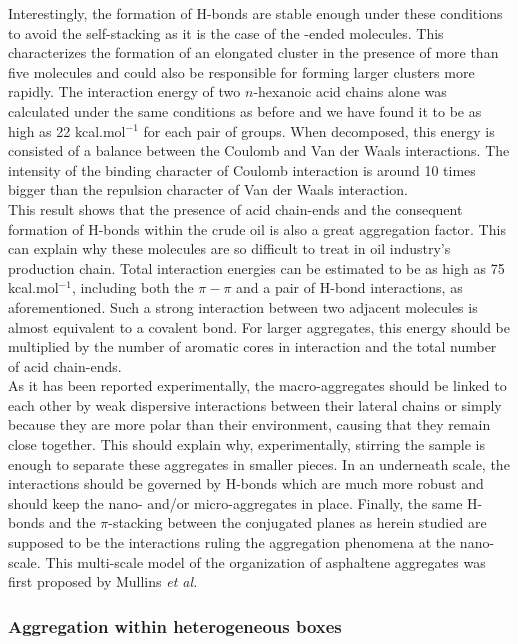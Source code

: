 Interestingly, the formation of H-bonds are stable enough under these conditions to avoid the self-stacking as it is the case of the -ended molecules. This characterizes the formation of an elongated cluster in the presence of more than five molecules and could also be responsible for forming larger clusters more rapidly. The interaction energy of two $n$-hexanoic acid chains alone was calculated under the same conditions as before and we have found it to be as high as 22 kcal.mol$^{-1}$ for each pair of  groups. When decomposed, this energy is consisted of a balance between the Coulomb and Van der Waals interactions. The intensity of the binding character of Coulomb interaction is around 10 times bigger than the repulsion character of Van der Waals interaction.\\ 

This result shows that the presence of acid chain-ends and the consequent formation of H-bonds within the crude oil is also a great aggregation factor. This can explain why these molecules are so difficult to treat in oil industry's production chain. Total interaction energies can be estimated to be as high as 75 kcal.mol$^{-1}$, including both the $\pi-\pi$ and a pair of H-bond interactions, as aforementioned. Such a strong interaction between two adjacent molecules is almost equivalent to a covalent bond. For larger aggregates, this energy should be multiplied by the number of aromatic cores in interaction and the total number of acid chain-ends.\\

As it has been reported experimentally,\cite{durand2010effect} the macro-aggregates should be linked to each other by weak dispersive interactions between their lateral chains or simply because they are more polar than their environment, causing that they remain close together. This should explain why, experimentally, stirring the sample is enough to separate these aggregates in smaller pieces. In an underneath scale, the interactions should be governed by H-bonds which are much more robust and should keep the nano- and/or micro-aggregates in place. Finally, the same H-bonds and the $\pi$-stacking between the conjugated planes as herein studied are supposed to be the interactions ruling the aggregation phenomena at the nano-scale. This multi-scale model of the organization of asphaltene aggregates was first proposed by Mullins \textit{et al.}\cite{mullins2010modified,mullins2011asphaltenes,mullins2012advances}

\subsubsection{Aggregation within heterogeneous boxes}

